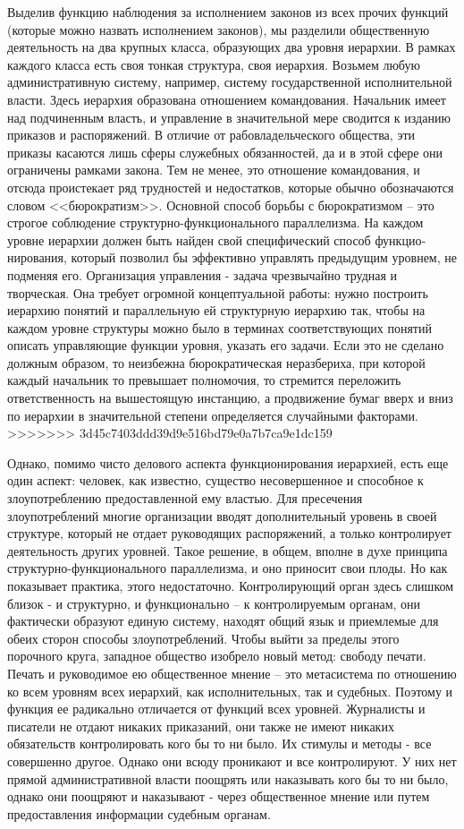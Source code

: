 \documentclass{book}
\begin{document}
Выделив функцию наблюдения за исполнением законов из всех прочих функций (которые можно назвать исполнением законов), мы разделили общественную деятельность на два крупных класса, образующих два уровня иерархии. В рамках каждого класса есть своя тонкая структура, своя иерархия. Возьмем любую административную систему, например, си­стему государственной исполнительной власти. Здесь иерархия образована отношением командования. Начальник имеет над подчиненным власть, и управление в значительной мере сво­дится к изданию приказов и распоряжений. В отличие от рабо­владельческого общества, эти приказы касаются лишь сферы служебных обязанностей, да и в этой сфере они ограничены рамками закона. Тем не менее, это отношение командования, и отсюда проистекает ряд трудностей и недостатков, которые обычно обозначаются словом <<бюрократизм>>. Основной способ борьбы с бюрократизмом -- это строгое соблюдение структур­но-функционального параллелизма. На каждом уровне иерар­хии должен быть найден свой специфический способ 
функцио­нирования, который позволил бы эффективно управлять преды­дущим уровнем, не подменяя его. Организация управления - задача чрезвычайно трудная и творческая. Она требует огром­ной концептуальной работы: нужно построить иерархию поня­тий и параллельную ей структурную иерархию так, чтобы на каждом уровне структуры можно было в терминах соответствующих понятий описать управляющие функции уровня, ука­зать его задачи. Если это не сделано должным образом, то неиз­бежна бюрократическая неразбериха, при которой каждый на­чальник то превышает полномочия, то стремится переложить ответственность на вышестоящую инстанцию, а продвижение бумаг вверх и вниз по иерархии в значительной степени опре­деляется случайными факторами.
>>>>>>> 3d45c7403ddd39d9e516bd79e0a7b7ca9e1dc159

Однако, помимо чисто делового аспекта функционирования иерархией, есть еще один аспект: человек, как известно, сущест­во несовершенное и способное к злоупотреблению предостав­ленной ему властью. Для пресечения злоупотреблений многие организации вводят дополнительный уровень в своей структу­ре, который не отдает руководящих распоряжений, а только контролирует деятельность других уровней. Такое решение, в общем, вполне в духе принципа структурно-функционально­го параллелизма, и оно приносит свои плоды. Но как показы­вает практика, этого недостаточно. Контролирующий орган здесь слишком близок - и структурно, и функционально -- к контролируемым органам, они фактически образуют единую систему, находят общий язык и приемлемые для обеих сто­рон способы злоупотреблений. Чтобы выйти за пределы этого порочного круга, западное общество изобрело новый метод: свободу печати. Печать и руководимое ею общественное мнение -- это метасистема  по отношению ко всем уровням всех иерархий, как исполнительных, так и судебных. 
Поэтому и функция ее радикально отличается от функций всех уровней. Журналисты и писатели не отдают никаких приказаний, они также не имеют никаких обязательств контролировать кого бы то ни было. Их стимулы и методы - все совершенно другое. Однако они всюду проникают и все контролируют. У них нет прямой административной власти поощрять или наказывать кого бы то ни было, однако они поощряют и наказывают - че­рез общественное мнение или путем предоставления информа­ции судебным органам.
\end{document}
